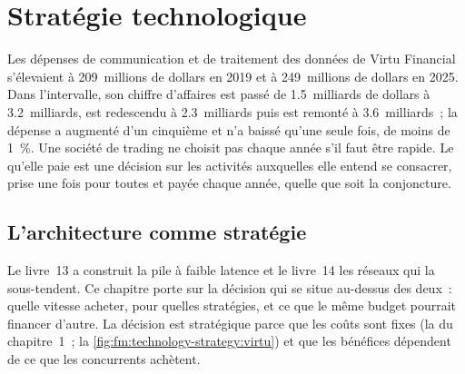 \chapter{Stratégie technologique}\label{ch:fm:technology-strategy}

Les dépenses de communication et de traitement des données de Virtu Financial s'élevaient à 209~millions de dollars en 2019 et à 249~millions de dollars en 2025. Dans l'intervalle, son chiffre d'affaires est passé de
1.5~milliards de dollars à 3.2~milliards, est redescendu à 2.3~milliards puis est remonté à 3.6~milliards~; la dépense a augmenté d'un cinquième et n'a baissé qu'une seule fois, de moins de 1~\%. Une société de trading ne
choisit pas chaque année s'il faut être rapide. Le  qu'elle paie est une décision sur les activités auxquelles elle entend se consacrer, prise une fois pour toutes et payée chaque
année, quelle que soit la conjoncture.

\section{L'architecture comme stratégie}

Le livre~13 a construit la pile à faible latence et le livre~14 les réseaux qui la sous-tendent. Ce chapitre porte sur la décision qui se situe au-dessus des deux~: quelle vitesse acheter, pour
quelles stratégies, et ce que le même budget pourrait financer d'autre. La décision est stratégique parce que les coûts sont fixes (la  du chapitre~1~; la \cref{fig:fm:technology-strategy:virtu}) et
que les bénéfices dépendent de ce que les concurrents achètent.

